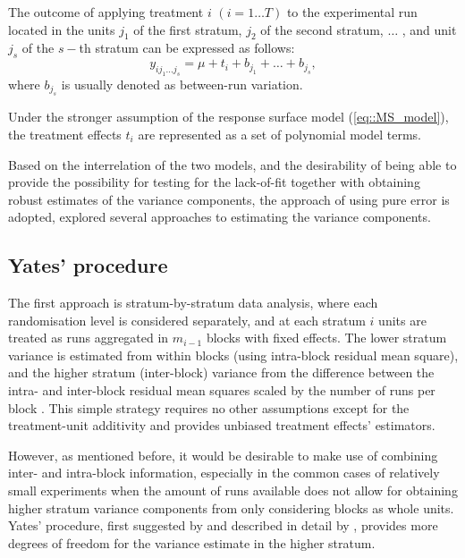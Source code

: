 The outcome of applying treatment $i$ $(i=1\ldots T)$ to the experimental run located in the units $j_1$ of the first stratum, $j_2$ of the second stratum, $\ldots$ , and unit $j_s$ of the $s-$th stratum can be expressed as follows:
\begin{equation}
\label{eq::ms_tr}
y_{ij_{1}...j_{s}}=\mu+t_{i}+b_{j_1}+\ldots +b_{j_s},
\end{equation}
where $b_{j_s}$ is usually denoted as between-run variation. 

Under the stronger assumption of the response surface model (\ref{eq::MS_model}), the treatment effects $t_{i}$ are represented as a set of polynomial model terms.  

Based on the interrelation of the two models, and the desirability of being able to provide the possibility for testing for the lack-of-fit together with obtaining robust estimates of the variance components, the approach of using pure error is adopted, \cite{GilmourGoos2016Robust} explored several approaches to estimating the variance components. 

\subsection{Yates' procedure}
\label{sec::ch7_varest}
The first approach is stratum-by-stratum data analysis, where each randomisation level is considered separately, and at each stratum $i$ units are treated as runs aggregated in $m_{i-1}$ blocks with fixed effects. The lower stratum variance is estimated from within blocks (using intra-block residual mean square), and the higher stratum (inter-block) variance from the difference between the intra- and inter-block residual mean squares scaled by the number of runs per block \citep{Hinkelmann2005Advanced}. This simple strategy requires no other assumptions except for the treatment-unit additivity and provides unbiased treatment effects' estimators.

However, as mentioned before, it would be desirable to make use of combining inter- and intra-block information, especially in the common cases of relatively small experiments when the amount of runs available does not allow for obtaining higher stratum variance components from only considering blocks as whole units. Yates' procedure, first suggested by \cite{yates1939recovery} and described in detail by \cite{Hinkelmann2005Advanced}, provides more degrees of freedom for the variance estimate in the higher stratum. 


